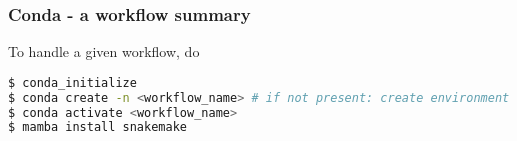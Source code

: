 \begin{frame}[fragile]
  \frametitle{Conda - a workflow summary}
  To handle a given workflow, do
  \begin{lstlisting}[language=Bash, style=Shell]
$ conda_initialize
$ conda create -n <workflow_name> # if not present: create environment
$ conda activate <workflow_name>
$ mamba install snakemake
  \end{lstlisting}
\end{frame}

